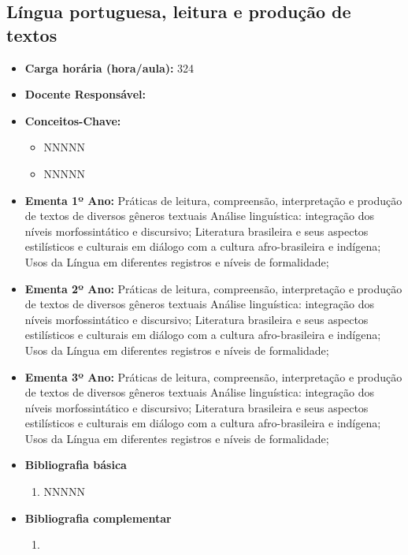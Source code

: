\documentclass[11pt,fleqn]{book} %
\begin{document}
\subsection{Língua portuguesa, leitura e produção de textos}\label{disc:linguaportuguesa}
\begin{itemize}
	\item \textbf{Carga horária (hora/aula):} 324
	\item \textbf{Docente Responsável:}
	\item \textbf{Conceitos-Chave:}
	\begin{itemize}
		\item NNNNN
		\item NNNNN
	\end{itemize}
	\item \textbf{Ementa 1º Ano:} 
	Práticas de leitura, compreensão, interpretação e produção de textos de diversos gêneros textuais
	Análise linguística: integração dos níveis morfossintático e discursivo;
	Literatura brasileira e seus aspectos estilísticos e culturais em diálogo com a cultura afro-brasileira e indígena;
	Usos da Língua em diferentes registros e níveis de formalidade;

	\item \textbf{Ementa 2º Ano:} 
	Práticas de leitura, compreensão, interpretação e produção de textos de diversos gêneros textuais
	Análise linguística: integração dos níveis morfossintático e discursivo;
	Literatura brasileira e seus aspectos estilísticos e culturais em diálogo com a cultura afro-brasileira e indígena;
	Usos da Língua em diferentes registros e níveis de formalidade;

	\item \textbf{Ementa 3º Ano:} 
	Práticas de leitura, compreensão, interpretação e produção de textos de diversos gêneros textuais
	Análise linguística: integração dos níveis morfossintático e discursivo;
	Literatura brasileira e seus aspectos estilísticos e culturais em diálogo com a cultura afro-brasileira e indígena;
	Usos da Língua em diferentes registros e níveis de formalidade;	
	
	\item \textbf{Bibliografia básica}
	\begin{enumerate}
		\item NNNNN
	\end{enumerate}
	\item \textbf{Bibliografia complementar}
	\begin{enumerate}
		\item 
	\end{enumerate}	
\end{itemize}
\end{document}
